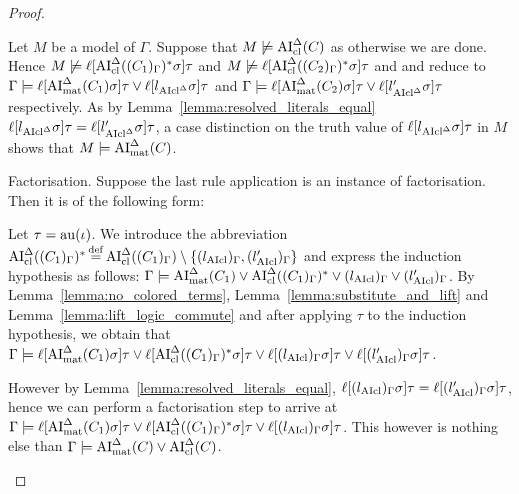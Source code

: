 \documentclass[,%
	draft=false,%
	numbers=noendperiod
	11pt,
	a4paper,
	oneside,%
	openany,
]{memoir}
\begin{document}
\begin{proof}
\begin{description}
\begin{enumerate}
					Let $M$ be a model of $\Gamma$. Suppose that $M \not\models \operatorname{AI}_\mathrm{cl}^\Delta(C)$ as otherwise we are done. Hence $M \not\models \ell[\operatorname{AI}_\mathrm{cl}^\Delta((C_1)_\Gamma)^*\sigma]\tau$ and $M \not\models \ell[\operatorname{AI}_\mathrm{cl}^\Delta((C_2)_\Gamma)^*\sigma]\tau$ and \markA{} and \markB{} reduce to
					$\Gamma \models \ell[\operatorname{AI}_\mathrm{mat}^\Delta(C_1)\sigma]\tau \lor \ell[l{_{\operatorname{AIcl}^\Delta}}\sigma]\tau$
					and
					$\Gamma \models \ell[\operatorname{AI}_\mathrm{mat}^\Delta(C_2)\sigma]\tau \lor \ell[l{_{\operatorname{AIcl}^\Delta}'}\sigma]\tau$ respectively.
					As by Lemma~\ref{lemma:resolved_literals_equal} $\ell[l{_{\operatorname{AIcl}^\Delta}}\sigma]\tau = \ell[l{_{\operatorname{AIcl}^\Delta}'}\sigma]\tau$, a case distinction on the truth value of $\ell[l{_{\operatorname{AIcl}^\Delta}}\sigma]\tau$ in $M$ shows that $M\models \operatorname{AI}_\mathrm{mat}^\Delta(C)$.


			\end{enumerate}



		\item{Factorisation.}
			Suppose the last rule application is an instance of factorisation. Then it is of the following form:
			\begin{prooftree}
			\end{prooftree}

			Let $\tau = \operatorname{au}(\iota)$.
			We introduce the abbreviation $\operatorname{AI}_\mathrm{cl}^\Delta( (C_1)_\Gamma)^* \operatorname{\stackrel{\mathrm{def}}{=}} \operatorname{AI}_\mathrm{cl}^\Delta( (C_1)_\Gamma) \setminus \{ (l_{\operatorname{AIcl}})_\Gamma , (l'_{\operatorname{AIcl}})_\Gamma \}$ and express the induction hypothesis as follows:
			$\Gamma \models \operatorname{AI}_\mathrm{mat}^\Delta(C_1) \lor \operatorname{AI}_\mathrm{cl}^\Delta( (C_1)_\Gamma)^* \lor (l_{\operatorname{AIcl}})_\Gamma \lor (l'_{\operatorname{AIcl}})_\Gamma $.
			By Lemma~\ref{lemma:no_colored_terms}, Lemma~\ref{lemma:substitute_and_lift} and Lemma~\ref{lemma:lift_logic_commute} and after applying $\tau$ to the induction hypothesis, we obtain that
			$\Gamma \models \ell[\operatorname{AI}_\mathrm{mat}^\Delta(C_1)\sigma]\tau \lor \ell[\operatorname{AI}_\mathrm{cl}^\Delta( (C_1)_\Gamma)^*\sigma]\tau \lor \ell[(l_{\operatorname{AIcl}})_\Gamma \sigma]\tau \lor \ell[(l'_{\operatorname{AIcl}})_\Gamma\sigma]\tau $.

			However by Lemma~\ref{lemma:resolved_literals_equal},
			$\ell[(l_{\operatorname{AIcl}})_\Gamma\sigma]\tau =
			\ell[(l'_{\operatorname{AIcl}})_\Gamma\sigma]\tau$, hence we can perform a factorisation step to arrive at
			$\Gamma \models \ell[\operatorname{AI}_\mathrm{mat}^\Delta(C_1)\sigma]\tau \lor \ell[\operatorname{AI}_\mathrm{cl}^\Delta( (C_1)_\Gamma)^*\sigma]\tau \lor \ell[(l_{\operatorname{AIcl}})_\Gamma \sigma]\tau$.
			This however is nothing else than $\Gamma\models \operatorname{AI}_\mathrm{mat}^\Delta(C) \lor \operatorname{AI}_\mathrm{cl}^\Delta(C)$.
			\qedhere
	\end{description}
\end{proof}
\end{document}
